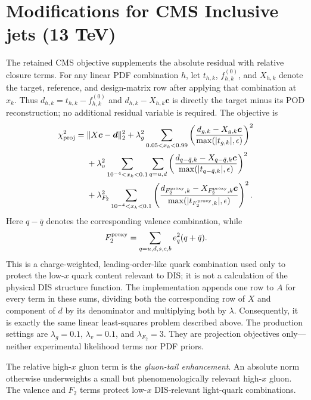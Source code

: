 \documentclass[11pt]{article}
\begin{document}
\section{Modifications for CMS Inclusive jets (13 TeV)}
The retained CMS objective supplements the absolute residual with relative
closure terms.  For any linear PDF combination $h$, let $t_{h,k}$,
$f^{(0)}_{h,k}$, and $X_{h,k}$ denote the target, reference, and design-matrix
row after applying that combination at $x_k$.  Thus
$d_{h,k}=t_{h,k}-f^{(0)}_{h,k}$ and
$d_{h,k}-X_{h,k}\boldsymbol c$ is directly the target minus its POD
reconstruction; no additional residual variable is required.  The objective is
\begin{align}
  \chi^2_{\rm proj} ={}& \|X\boldsymbol c-\boldsymbol d\|_2^2
  + \lambda_g^2
    \sum_{0.05<x_k<0.99}
    \left(\frac{d_{g,k}-X_{g,k}\boldsymbol c}
    {\max(|t_{g,k}|,\epsilon)}\right)^2
    \nonumber\\
  &+ \lambda_v^2
    \sum_{10^{-4}<x_k<0.1}\sum_{q=u,d}
    \left(\frac{d_{q-\bar q,k}-X_{q-\bar q,k}\boldsymbol c}
    {\max(|t_{q-\bar q,k}|,\epsilon)}\right)^2
    \nonumber\\
  &+ \lambda_{F_2}^2
    \sum_{10^{-4}<x_k<0.1}
    \left(\frac{d_{F_2^{\rm proxy},k}-X_{F_2^{\rm proxy},k}\boldsymbol c}
    {\max(|t_{F_2^{\rm proxy},k}|,\epsilon)}\right)^2.
\end{align}
Here $q-\bar q$ denotes the corresponding valence combination, while
\begin{equation}
  F_2^{\rm proxy}=
  \sum_{q=u,d,s,c,b}e_q^2(q+\bar q).
\end{equation}
This is a charge-weighted, leading-order-like quark combination used only to
protect the low-$x$ quark content relevant to DIS; it is not a calculation of
the physical DIS structure function.
The implementation appends one row to $A$ for every term in these sums,
dividing both the corresponding row of $X$ and component of $d$ by its
denominator and multiplying both by $\lambda$. Consequently, it is exactly
the same linear least-squares problem described above. The production
settings are $\lambda_g=0.1$, $\lambda_v=0.1$, and $\lambda_{F_2}=3$.
They are projection objectives only---neither experimental likelihood terms
nor PDF priors.

The relative high-$x$ gluon term is the \emph{gluon-tail enhancement}. An absolute norm otherwise underweights a small but phenomenologically relevant high-$x$ gluon. The valence and $F_2$ terms protect low-$x$ DIS-relevant light-quark combinations.
\end{document}
